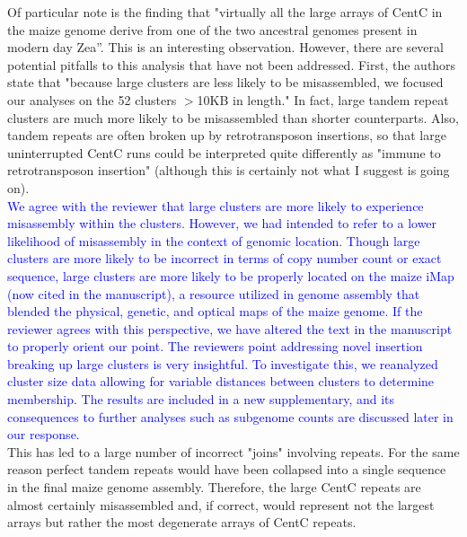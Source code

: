 \documentclass[]{article}
\newcommand{\res}[1]{\noindent \textcolor{blue}{{#1}} \\}
\begin{document}
Of particular note is the finding that "virtually all the large arrays of CentC in the maize genome derive from one of the two ancestral genomes present in modern day Zea”.  This is an interesting observation.  However, there are several potential pitfalls to this analysis that have not been addressed.  First, the authors state that "because large clusters are less likely to be misassembled, we focused our analyses on the 52 clusters $>$10KB in length."  In fact, large tandem repeat clusters are much more likely to be misassembled than shorter counterparts. Also, tandem repeats are often broken up by retrotransposon insertions, so that large uninterrupted CentC runs could be interpreted quite differently as "immune to retrotransposon insertion" (although this is certainly not what I suggest is going on). \\

\res{We agree with the reviewer that large clusters are more likely to experience misassembly within the clusters.  
However, we had intended to refer to a lower likelihood of misassembly in the context of genomic location.  
Though large clusters are more likely to be incorrect in terms of copy number count or exact sequence, large clusters are more likely to be properly located on the maize iMap (now cited in the manuscript), a resource utilized in genome assembly that blended the physical, genetic, and optical maps of the maize genome.  
If the reviewer agrees with this perspective, we have altered the text in the manuscript to properly orient our point.
The reviewers point addressing novel insertion breaking up large clusters is very insightful.
To investigate this, we reanalyzed cluster size data allowing for variable distances between clusters to determine membership.
The results are included in a new supplementary, and its consequences to further analyses such as subgenome counts are discussed later in our response.}

This has led to a large number of incorrect "joins" involving repeats.  
For the same reason perfect tandem repeats would have been collapsed into a single sequence in the final maize genome assembly.  
Therefore, the large CentC repeats are almost certainly misassembled and, if correct, would represent not the largest arrays but rather the most degenerate arrays of CentC repeats.\\
\end{document}
